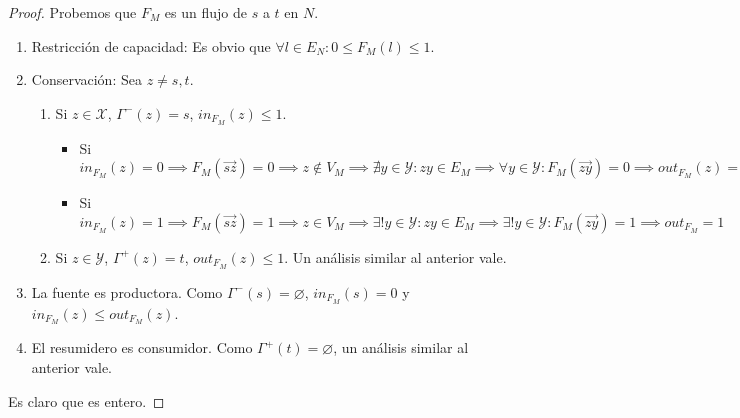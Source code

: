 \begin{proof}
Probemos que $F_M$ es un flujo de $s$ a $t$ en $N$.
\begin{enumerate}
    \item Restricción de capacidad: Es obvio que $\forall l \in E_N : 0 \le F_M(l) \le 1$.
    \item Conservación: Sea $z \neq s,t$.
    \begin{enumerate}
        \item Si $z \in \mathcal{X}$, $\Gamma^-(z) = {s}$, $in_{F_M}(z) \le 1$.
        \begin{itemize}
            \item Si $in_{F_M}(z) = 0 \implies F_M(\overrightarrow{sz}) = 0 \implies z \notin V_M \implies \nexists y \in \mathcal{Y} : zy \in E_M \implies \forall y \in \mathcal{Y} : F_M(\overrightarrow{zy}) = 0 \implies out_{F_M}(z) = 0$
            \item Si $in_{F_M}(z) = 1 \implies F_M(\overrightarrow{sz}) = 1 \implies z \in V_M \implies \exists! y \in \mathcal{Y} : zy \in E_M \implies \exists! y \in \mathcal{Y} : F_M(\overrightarrow{zy}) = 1 \implies out_{F_M} = 1$
        \end{itemize}
        \item Si $z \in \mathcal{Y}$, $\Gamma^+(z) = {t}$, $out_{F_M}(z) \le 1$. Un análisis similar al anterior vale.
    \end{enumerate}
    \item La fuente es productora. Como $\Gamma^-(s) = \varnothing$, $in_{F_M}(s) = 0$ y $in_{F_M}(z) \le out_{F_M}(z)$.
    \item El resumidero es consumidor. Como $\Gamma^+(t) = \varnothing$, un análisis similar al anterior vale.
    \end{enumerate}
Es claro que es entero.


\end{proof}
